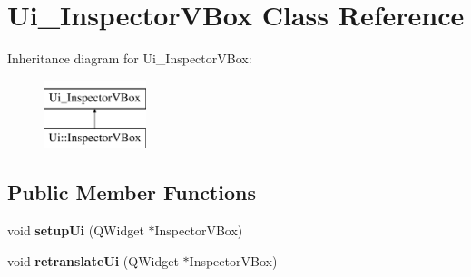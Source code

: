 \hypertarget{class_ui___inspector_v_box}{}\section{Ui\+\_\+\+Inspector\+V\+Box Class Reference}
\label{class_ui___inspector_v_box}
Inheritance diagram for Ui\+\_\+\+Inspector\+V\+Box\+:\begin{figure}[H]
\begin{center}
\leavevmode
\includegraphics[height=2.000000cm]{class_ui___inspector_v_box}
\end{center}
\end{figure}
\subsection*{Public Member Functions}
\begin{DoxyCompactItemize}
\item 
\mbox{\label{class_ui___inspector_v_box_a489ac03103246683eeaad9b2ac49d078}} 
void {\bfseries setup\+Ui} (Q\+Widget $\ast$Inspector\+V\+Box)
\item 
\mbox{\label{class_ui___inspector_v_box_aba830f5fdb8eefd8936d9bc0779d44c4}} 
void {\bfseries retranslate\+Ui} (Q\+Widget $\ast$Inspector\+V\+Box)
\end{DoxyCompactItemize}

